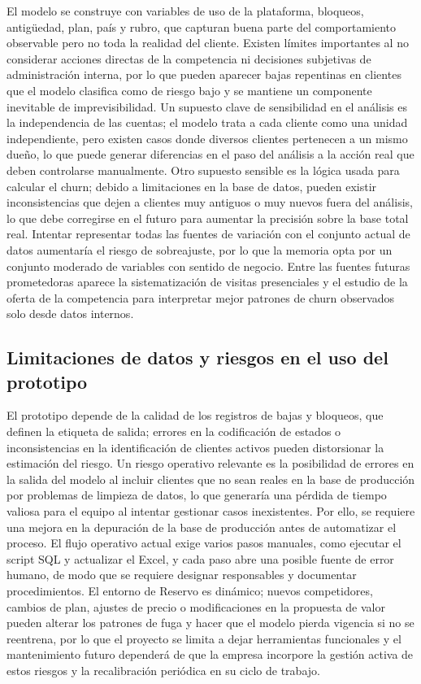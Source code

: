 El modelo se construye con variables de uso de la plataforma, bloqueos, antigüedad, plan, país y rubro, que capturan buena parte del comportamiento observable pero no toda la realidad del cliente. Existen límites importantes al no considerar acciones directas de la competencia ni decisiones subjetivas de administración interna, por lo que pueden aparecer bajas repentinas en clientes que el modelo clasifica como de riesgo bajo y se mantiene un componente inevitable de imprevisibilidad. Un supuesto clave de sensibilidad en el análisis es la independencia de las cuentas; el modelo trata a cada cliente como una unidad independiente, pero existen casos donde diversos clientes pertenecen a un mismo dueño, lo que puede generar diferencias en el paso del análisis a la acción real que deben controlarse manualmente. Otro supuesto sensible es la lógica usada para calcular el churn; debido a limitaciones en la base de datos, pueden existir inconsistencias que dejen a clientes muy antiguos o muy nuevos fuera del análisis, lo que debe corregirse en el futuro para aumentar la precisión sobre la base total real. Intentar representar todas las fuentes de variación con el conjunto actual de datos aumentaría el riesgo de sobreajuste, por lo que la memoria opta por un conjunto moderado de variables con sentido de negocio. Entre las fuentes futuras prometedoras aparece la sistematización de visitas presenciales y el estudio de la oferta de la competencia para interpretar mejor patrones de churn observados solo desde datos internos.

\subsection{Limitaciones de datos y riesgos en el uso del prototipo}

El prototipo depende de la calidad de los registros de bajas y bloqueos, que definen la etiqueta de salida; errores en la codificación de estados o inconsistencias en la identificación de clientes activos pueden distorsionar la estimación del riesgo. Un riesgo operativo relevante es la posibilidad de errores en la salida del modelo al incluir clientes que no sean reales en la base de producción por problemas de limpieza de datos, lo que generaría una pérdida de tiempo valiosa para el equipo al intentar gestionar casos inexistentes. Por ello, se requiere una mejora en la depuración de la base de producción antes de automatizar el proceso. El flujo operativo actual exige varios pasos manuales, como ejecutar el script SQL y actualizar el Excel, y cada paso abre una posible fuente de error humano, de modo que se requiere designar responsables y documentar procedimientos. El entorno de Reservo es dinámico; nuevos competidores, cambios de plan, ajustes de precio o modificaciones en la propuesta de valor pueden alterar los patrones de fuga y hacer que el modelo pierda vigencia si no se reentrena, por lo que el proyecto se limita a dejar herramientas funcionales y el mantenimiento futuro dependerá de que la empresa incorpore la gestión activa de estos riesgos y la recalibración periódica en su ciclo de trabajo.

